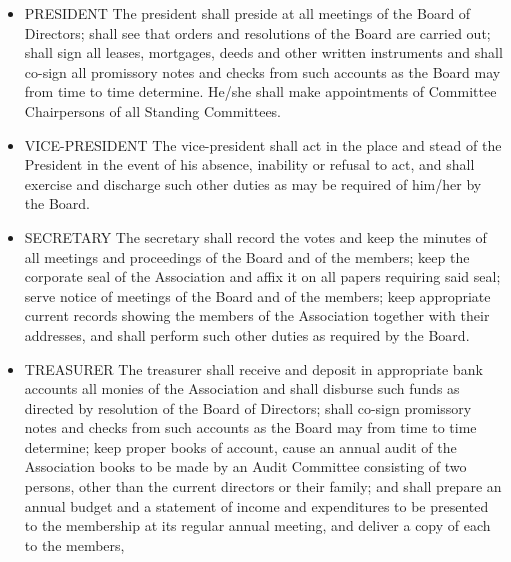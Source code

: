 \documentclass[10pt, letterpaper]{article}
\begin{document}
\begin{enumerate}
\begin{itemize}
      \item PRESIDENT
        The president shall preside at all meetings of the Board of Directors; shall see that orders and resolutions of the Board are carried out; shall sign all leases, mortgages, deeds and other written instruments and shall co-sign all promissory notes and checks from such accounts as the Board may from time to time determine.
        He/she shall make appointments of Committee Chairpersons of all Standing Committees.
      \item VICE-PRESIDENT
        The vice-president shall act in the place and stead of the President in the event of his absence, inability or refusal to act, and shall exercise and discharge such other duties as may be required of him/her by the Board.
      \item SECRETARY
        The secretary shall record the votes and keep the minutes of all meetings and proceedings of the Board and of the members; keep the corporate seal of the Association and affix it on all papers requiring said seal; serve notice of meetings of the Board and of the members; keep appropriate current records showing the members of the Association together with their addresses, and shall perform such other duties as required by the Board.
      \item TREASURER
        The treasurer shall receive and deposit in appropriate bank accounts all monies of the Association and shall disburse such funds as directed by resolution of the Board of Directors; shall co-sign promissory notes and checks from such accounts as the Board may from time to time determine; keep proper books of account, cause an annual audit of the Association books to be made by an Audit Committee consisting of two persons, other than the current directors or their family; and shall prepare an annual budget and a statement of income and expenditures to be presented to the membership at its regular annual meeting, and deliver a copy of each to the members,
    \end{itemize}
\end{enumerate}

\end{document}
